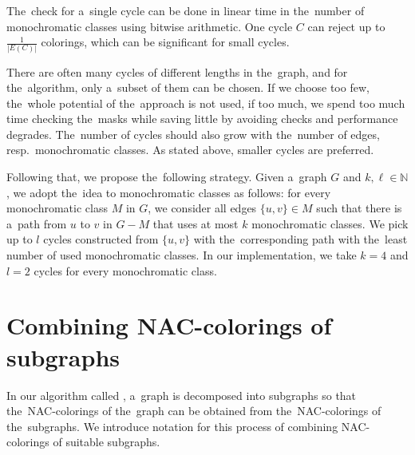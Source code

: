 The~check for a~single cycle can be done in linear time
in the~number of monochromatic classes using bitwise arithmetic.
One cycle $C$ can reject up to $\frac{1}{|E(C)|}$ colorings,
which can be significant for small cycles.

There are often many cycles of different lengths in the~graph,
and for the~algorithm, only a~subset of them can be chosen.
If we choose too few, the~whole potential of the~approach is not used, if too much,
we spend too much time checking the~masks while saving little
by avoiding \IsNACColoring{} checks and performance degrades.
The~number of cycles should also grow with the~number of edges,
resp.\ monochromatic classes.
As stated above, smaller cycles are preferred.

Following that, we propose the~following strategy.
Given a~graph $G$ and $k,\ell\in \mathbb{N}$,
we adopt the~idea to monochromatic classes as follows:
for every monochromatic class $M$ in $G$,
we consider all edges $\{u, v\} \in M$ such that there is a~path from $u$ to $v$
in $G - M$ that uses at most $k$ monochromatic classes.
We pick up to $l$ cycles constructed from $\{u, v\}$ with the~corresponding
path with the~least number of used monochromatic classes.
In our implementation, we take $k=4$ and $l=2$ cycles for every monochromatic class.

\section{Combining NAC-colorings of subgraphs}%
\label{sec:combining}

In our algorithm called \Subgraphs{}, a~graph is decomposed into subgraphs so that
the~NAC-colorings of the~graph can be obtained from the~NAC-colorings of the~subgraphs.
We introduce notation for this process of combining NAC-colorings of suitable subgraphs.


